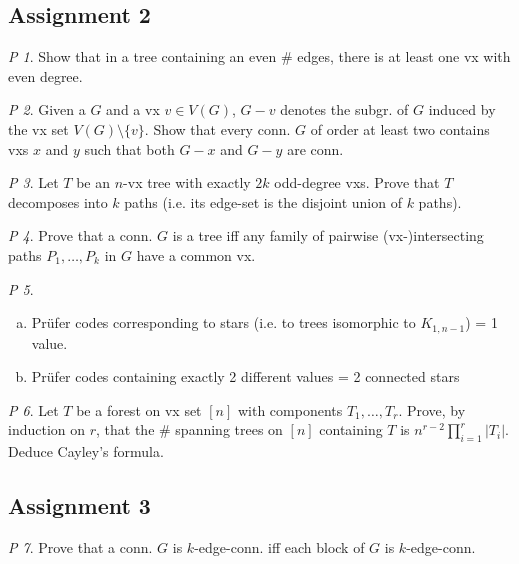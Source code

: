 \documentclass[11pt, fleqn, a4paper, landscape]{article}
\theoremstyle{plain} %
\theoremstyle{remark} %
\newtheorem{problem}{P}
\theoremstyle{definition} %
\begin{document}
\begin{multicols}{5}
\subsection{Assignment 2}

\begin{problem}
Show that in a tree containing an even \# edges, there is at least one
vx with even degree.
\end{problem}

\begin{problem}
Given a $G$ and a vx $v \in V (G)$, $G - v$ denotes the subgr. of $G$ induced by the vx set $V (G)\setminus\{v\}$. Show that every conn. $G$ of order at least two contains vxs $x$ and $y$ such that both $G- x$ and $G-y$ are conn.
\end{problem}

\begin{problem}
Let $T$ be an $n$-vx tree with exactly $2k$ odd-degree vxs. Prove that $T$ decomposes into $k$ paths (i.e. its edge-set is the disjoint union of $k$ paths).
\end{problem}

\begin{problem}
Prove that a conn. $G$ is a tree iff any family of pairwise (vx-)intersecting paths $P_1,\dots,P_k$ in $G$ have a common vx.
\end{problem}

\begin{problem}
\begin{enumerate}[(a)]
\item Prüfer codes corresponding to stars (i.e. to trees isomorphic to $K_{1,n-1}$) = 1 value.
\item Prüfer codes containing exactly 2 different values = 2 connected stars
\end{enumerate}
\end{problem}

\begin{problem}
Let $T$ be a forest on vx set $[n]$ with components $T_1,\dots,T_r$. Prove, by induction on $r$, that the \# spanning trees on $[n]$ containing $T$ is $n^{r-2}\prod_{i=1}^{r}|T_i|$. Deduce Cayley's formula.
\end{problem}

\subsection{Assignment 3}

\begin{problem}
Prove that a conn. $G$ is $k$-edge-conn. iff each block of $G$ is $k$-edge-conn.
\end{problem}


\end{multicols}
\end{document}
